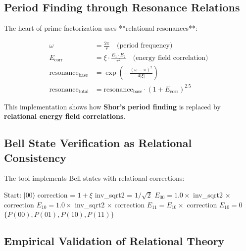 	\subsection{Period Finding through Resonance Relations}
	
	The heart of prime factorization uses **relational resonances**:
	
	\begin{align}
		\omega &= \frac{2\pi}{r} \quad \text{(period frequency)} \\
		E_{\text{corr}} &= \xi \cdot \frac{E_1 \cdot E_2}{r^2} \quad \text{(energy field correlation)} \\
		\text{resonance}_{\text{base}} &= \exp\left(-\frac{(\omega - \pi)^2}{4|\xi|}\right) \\
		\text{resonance}_{\text{total}} &= \text{resonance}_{\text{base}} \cdot (1 + E_{\text{corr}})^{2.5}
	\end{align}
	
	This implementation shows how \textbf{Shor's period finding} is replaced by \textbf{relational energy field correlations}.
	
	\subsection{Bell State Verification as Relational Consistency}
	
	The tool implements Bell states with relational corrections:
	
	\begin{algorithm}[H]
\scriptsize
		\caption{T0-Bell State Generation}
		\label{alg:bell_t0}
		\begin{algorithmic}[1]
			\STATE Start: $|00\rangle$
			\STATE correction = $1 + \xi$
			\STATE inv\_sqrt2 = $1/\sqrt{2}$
			\STATE 
			\STATE $E_{00} = 1.0 \times$ inv\_sqrt2 $\times$ correction
			\STATE $E_{10} = 1.0 \times$ inv\_sqrt2 $\times$ correction
			\STATE 
			\STATE $E_{11} = E_{10} \times$ correction
			\STATE $E_{10} = 0$
			\STATE 
			\RETURN $\{P(00), P(01), P(10), P(11)\}$
		\end{algorithmic}
	\end{algorithm}
	
	\subsection{Empirical Validation of Relational Theory}
	
